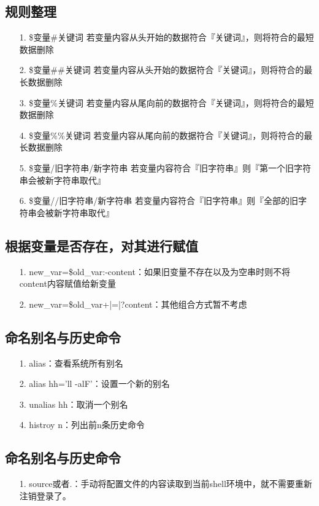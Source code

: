 \documentclass[a4paper,left=1.5cm,right=1.5cm,11pt]{article}
\begin{document}
\subsection{规则整理}
\begin{itemize}
	\item[1.]\${变量#关键词} 若变量内容从头开始的数据符合『关键词』，则将符合的最短数据删除
	\item[2.]\${变量##关键词}	若变量内容从头开始的数据符合『关键词』，则将符合的最长数据删除
	\item[3.]\${变量\%关键词} 若变量内容从尾向前的数据符合『关键词』，则将符合的最短数据删除
	\item[4.]\${变量\%\%关键词}	若变量内容从尾向前的数据符合『关键词』，则将符合的最长数据删除
	\item[5.]\${变量/旧字符串/新字符串} 若变量内容符合『旧字符串』则『第一个旧字符串会被新字符串取代』
	\item[6.]\${变量//旧字符串/新字符串} 若变量内容符合『旧字符串』则『全部的旧字符串会被新字符串取代』
\end{itemize}
\subsection{根据变量是否存在，对其进行赋值}
\begin{itemize}
	\item[1.]new_var=\${old_var:-content}：如果旧变量不存在以及为空串时则不将content内容赋值给新变量
	\item[2.]new_var=\${old_var+|=|?content}：其他组合方式暂不考虑
\end{itemize}
\subsection{命名别名与历史命令}
\begin{itemize}
	\item[1.]alias：查看系统所有别名
	\item[2.]alias hh='ll -alF'：设置一个新的别名
	\item[3.]unalias hh：取消一个别名
	\item[4.]histroy n：列出前n条历史命令
\end{itemize}
\subsection{命名别名与历史命令}
\begin{itemize}
	\item[1.]source或者.：手动将配置文件的内容读取到当前shell环境中，就不需要重新注销登录了。
\end{itemize}
\end{document}
